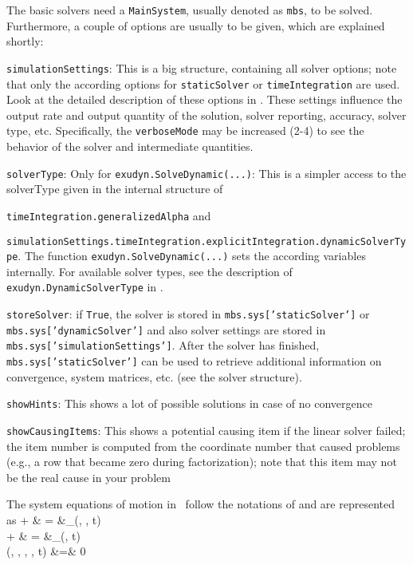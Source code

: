 The basic solvers need a \texttt{MainSystem}, usually denoted as \texttt{mbs}, to be solved. Furthermore, a couple of options are usually to be given, which are explained shortly:
\bi
  \item \texttt{simulationSettings}: This is a big structure, containing all solver options; note that only the according options for \texttt{staticSolver} or \texttt{timeIntegration} are used. Look at the detailed description of these options in . These settings influence the output rate and output quantity of the solution, solver reporting, accuracy, solver type, etc. Specifically, the \texttt{verboseMode} may be increased (2-4) to see the behavior of the solver and intermediate quantities.
  \item \texttt{solverType}: Only for \texttt{exudyn.SolveDynamic(...)}: This is a simpler access to the solverType given in the internal structure of 
  \bi
  \item[] \texttt{timeIntegration.generalizedAlpha} and 
  \item[] \texttt{simulationSettings.timeIntegration.explicitIntegration.dynamicSolverType}.
  \ei
\ei
The function \texttt{exudyn.SolveDynamic(...)} sets the according variables internally. For available solver types, see the description of \texttt{exudyn.DynamicSolverType} in .
\bi
  \item \texttt{storeSolver}: if \texttt{True}, the solver is stored in \texttt{mbs.sys['staticSolver']} or \texttt{mbs.sys['dynamicSolver']} and also solver settings are stored in \texttt{mbs.sys['simulationSettings']}. After the solver has finished, \texttt{mbs.sys['staticSolver']} can be used to retrieve additional information on convergence, system matrices, etc. (see the solver structure).
  \item \texttt{showHints}: This shows a lot of possible solutions in case of no convergence
  \item \texttt{showCausingItems}: This shows a potential causing item if the linear solver failed; the item number is computed from the coordinate number that caused problems (e.g., a row that became zero during factorization); note that this item may not be the real cause in your problem
\ei

The system equations of motion in \codeName\ follow the notations of  and are represented as 
\bea \label{eq_system_EOM}
  \Mm \ddot \qv +  \tlambda & = &\fv_\SO(\qv, \dot \qv, t) \\
  \dot \yv +  \tlambda & = &\fv_\FO(\yv, t) \\
  \gv(\qv, \dot \qv, \yv, \tlambda, t) &=& 0
\eea


